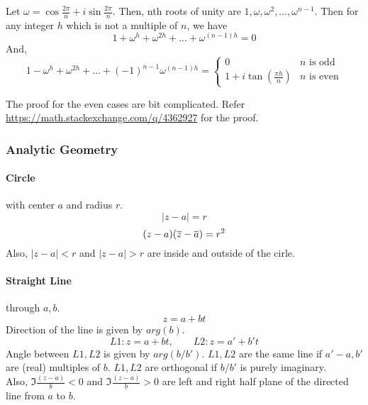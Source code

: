 Let $\omega = \cos \frac{2\pi}{n} + i\sin \frac{2\pi}{n}$.
Then, nth roots of unity are $1,\omega,\omega^2,\dots,\omega^{n-1}$.
Then for any integer $h$ which is not a multiple of $n$, we have
\begin{equation}
	1+\omega^h + \omega^{2h} + \dots + \omega^{(n-1)h} = 0
\end{equation}
And,
\begin{equation}
	1-\omega^h + \omega^{2h} + \dots + (-1)^{n-1}\omega^{(n-1)h} = \begin{cases} 0 & n \text{ is odd } \\ 1+i\tan(\frac{\pi h}{n}) & n \text{ is even} \end{cases}
\end{equation}
\begin{commentary}
	The proof for the even cases are bit complicated.
	Refer \url{https://math.stackexchange.com/q/4362927} for the proof.
\end{commentary}

\subsubsection{Analytic Geometry}
\paragraph{Circle} with center $a$ and radius $r$.
\begin{equation}
	|z-a| = r
\end{equation}
\[ (z-a)(\overline{z} - \overline{a}) = r^2 \]
Also, $|z-a| < r$ and $|z-a| > r$ are inside and outside of the cirle.
\paragraph{Straight Line} through $a,b$.
\begin{equation}
	z = a+bt
\end{equation}
Direction of the line is given by $arg(b)$.
\[ L1 : z = a+bt,\qquad L2 : z = a'+b't \]
Angle between $L1,L2$ is given by $arg (b/b')$.
$L1, L2$ are the same line if $a'-a,b'$ are (real) multiples of $b$.
$L1,L2$ are orthogonal if $b/b'$ is purely imaginary.\\

Also, $\Im\frac{(z-a)}{b} < 0$ and $\Im\frac{(z-a)}{b} > 0$ are left and right half plane of the directed line from $a$ to $b$.

